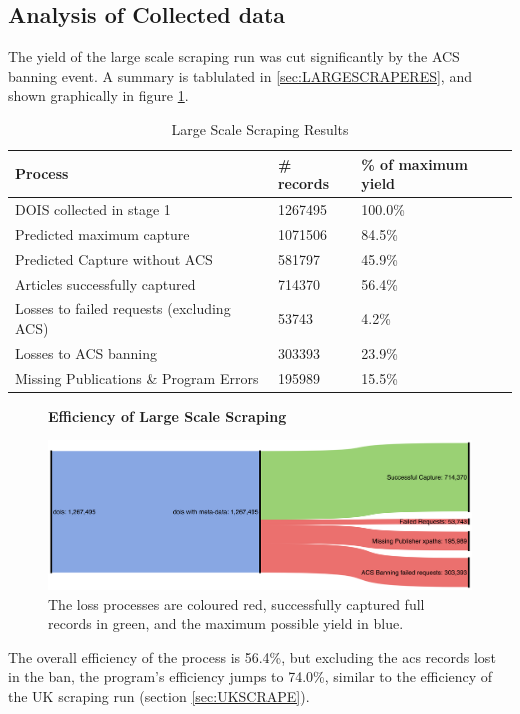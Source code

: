 \subsection{Analysis of Collected data}
The yield of the large scale scraping run was cut significantly by the ACS banning event. A summary is tablulated in \ref{sec:LARGESCRAPERES}, and shown graphically in figure \ref{fig:LARGESANK}.
\begin{table}[h!]
\label{tab:LARGESCRAPERES}
\caption{Large Scale Scraping Results}
\begin{center}
\begin{tabular}{||l|l|l||}
\hline
Process & \# records & \% of maximum yield\\
\hline
DOIS collected in stage 1 &  1267495 &100.0\%\\
\hline
Predicted maximum capture & 1071506 &  84.5\%\\
Predicted Capture without ACS & 581797 & 45.9\%\\
\hline
Articles successfully captured & 714370 & 56.4\%\\
Losses to failed requests (excluding ACS)& 53743 & 4.2\%\\
Losses to ACS banning & 303393 & 23.9\%\\
Missing Publications \& Program Errors & 195989 & 15.5\%\\
\hline
\end{tabular}
\end{center}
\end{table}
\begin{figure}[H]
    \centering
    \textbf{Efficiency of Large Scale Scraping}\par\medskip
    \includegraphics[width=\textwidth]{Data_Acquisition/large_sankey.png}
    \caption{The loss processes are coloured red, successfully captured full records in green, and the maximum possible yield in blue.}
     \label{fig:LARGESANK}
\end{figure}

The overall efficiency of the process is 56.4\%, but excluding the acs records lost in the ban, the program's efficiency jumps to 74.0\%, similar to the efficiency of the UK scraping run (section \ref{sec:UKSCRAPE}). 

